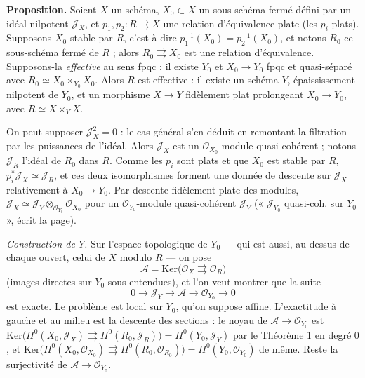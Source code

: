 \documentclass[11pt,a4paper]{article}
\begin{document}
\textbf{Proposition.} Soient $X$ un schéma, $X_0 \subset X$ un sous-schéma
fermé défini par un idéal nilpotent $\mathcal{J}_X$, et $p_1, p_2 : R
\rightrightarrows X$ une relation d'équivalence plate (les $p_i$ plats).
Supposons $X_0$ stable par $R$, c'est-à-dire $p_1^{-1}(X_0) = p_2^{-1}(X_0)$,
et notons $R_0$ ce sous-schéma fermé de $R$ ; alors $R_0 \rightrightarrows
X_0$ est une relation d'équivalence. Supposons-la
\emph{effective} au sens fpqc : il existe $Y_0$ et $X_0 \to Y_0$ fpqc et
quasi-séparé avec $R_0 \simeq X_0 \times_{Y_0} X_0$. Alors $R$ est effective :
il existe un schéma $Y$, épaississement nilpotent de $Y_0$, et un morphisme
$X \to Y$ fidèlement plat prolongeant $X_0 \to Y_0$, avec $R \simeq X \times_Y
X$.

On peut supposer $\mathcal{J}_X^2 = 0$ : le cas général s'en déduit en
remontant la filtration par les puissances de l'idéal. Alors $\mathcal{J}_X$
est un $\mathcal{O}_{X_0}$-module quasi-cohérent ; notons $\mathcal{J}_R$
l'idéal de $R_0$ dans $R$. Comme les $p_i$ sont plats et que $X_0$ est stable
par $R$, $p_i^{*}\mathcal{J}_X \simeq \mathcal{J}_R$, et ces deux isomorphismes forment une donnée de descente
sur $\mathcal{J}_X$ relativement à $X_0 \to Y_0$. Par descente fidèlement plate
des modules, $\mathcal{J}_X \simeq \mathcal{J}_Y \otimes_{\mathcal{O}_{Y_0}}
\mathcal{O}_{X_0}$ pour un $\mathcal{O}_{Y_0}$-module quasi-cohérent
$\mathcal{J}_Y$ (« $\mathcal{J}_{Y_0}$ quasi-coh. sur $Y_0$ », écrit la page).

\emph{Construction de $Y$.} Sur l'espace topologique de $Y_0$ — qui est aussi,
au-dessus de chaque ouvert, celui de $X$ modulo $R$ — on pose
\[
  \mathcal{A} = \mathrm{Ker}\bigl(\mathcal{O}_X \rightrightarrows
  \mathcal{O}_R\bigr)
\]
(images directes sur $Y_0$ sous-entendues), et l'on veut montrer que la suite
\[
  0 \to \mathcal{J}_Y \to \mathcal{A} \to \mathcal{O}_{Y_0} \to 0
\]
est exacte. Le problème est local sur $Y_0$, qu'on suppose affine. L'exactitude
à gauche et au milieu est la descente des sections : le noyau de $\mathcal{A}
\to \mathcal{O}_{Y_0}$ est $\mathrm{Ker}\bigl(H^0(X_0, \mathcal{J}_X)
\rightrightarrows H^0(R_0, \mathcal{J}_R)\bigr) = H^0(Y_0, \mathcal{J}_Y)$ par
le Théorème 1 en degré $0$, et $\mathrm{Ker}\bigl(H^0(X_0, \mathcal{O}_{X_0})
\rightrightarrows H^0(R_0, \mathcal{O}_{R_0})\bigr) = H^0(Y_0,
\mathcal{O}_{Y_0})$ de même. Reste la surjectivité de $\mathcal{A} \to
\mathcal{O}_{Y_0}$.
\end{document}
